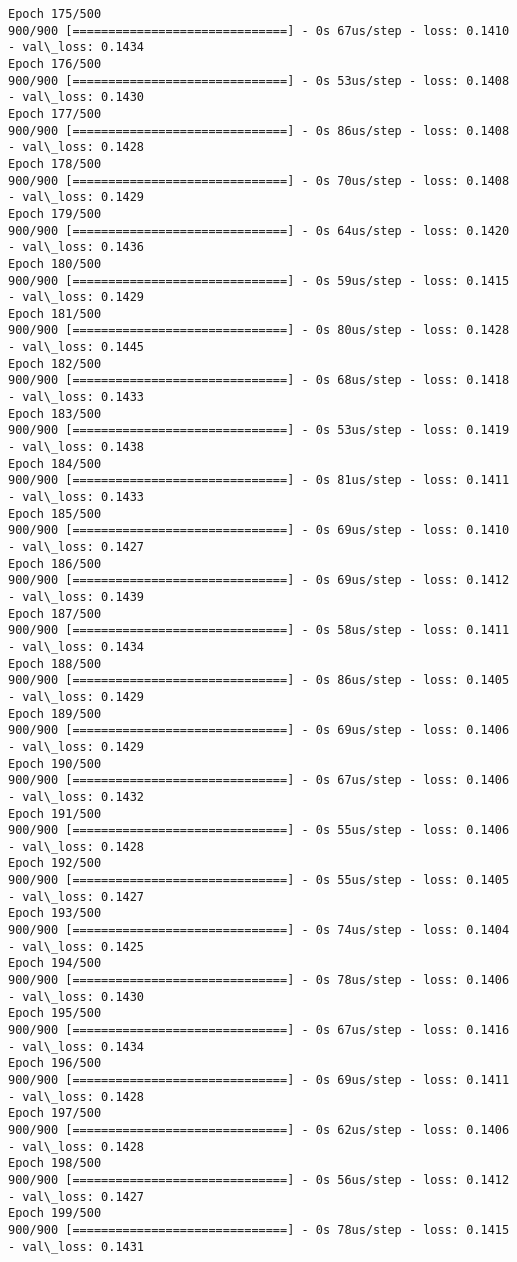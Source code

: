 \documentclass[11pt]{article}
\begin{document}
\begin{Verbatim}[commandchars=\\\{\}]
Epoch 175/500
900/900 [==============================] - 0s 67us/step - loss: 0.1410 - val\_loss: 0.1434
Epoch 176/500
900/900 [==============================] - 0s 53us/step - loss: 0.1408 - val\_loss: 0.1430
Epoch 177/500
900/900 [==============================] - 0s 86us/step - loss: 0.1408 - val\_loss: 0.1428
Epoch 178/500
900/900 [==============================] - 0s 70us/step - loss: 0.1408 - val\_loss: 0.1429
Epoch 179/500
900/900 [==============================] - 0s 64us/step - loss: 0.1420 - val\_loss: 0.1436
Epoch 180/500
900/900 [==============================] - 0s 59us/step - loss: 0.1415 - val\_loss: 0.1429
Epoch 181/500
900/900 [==============================] - 0s 80us/step - loss: 0.1428 - val\_loss: 0.1445
Epoch 182/500
900/900 [==============================] - 0s 68us/step - loss: 0.1418 - val\_loss: 0.1433
Epoch 183/500
900/900 [==============================] - 0s 53us/step - loss: 0.1419 - val\_loss: 0.1438
Epoch 184/500
900/900 [==============================] - 0s 81us/step - loss: 0.1411 - val\_loss: 0.1433
Epoch 185/500
900/900 [==============================] - 0s 69us/step - loss: 0.1410 - val\_loss: 0.1427
Epoch 186/500
900/900 [==============================] - 0s 69us/step - loss: 0.1412 - val\_loss: 0.1439
Epoch 187/500
900/900 [==============================] - 0s 58us/step - loss: 0.1411 - val\_loss: 0.1434
Epoch 188/500
900/900 [==============================] - 0s 86us/step - loss: 0.1405 - val\_loss: 0.1429
Epoch 189/500
900/900 [==============================] - 0s 69us/step - loss: 0.1406 - val\_loss: 0.1429
Epoch 190/500
900/900 [==============================] - 0s 67us/step - loss: 0.1406 - val\_loss: 0.1432
Epoch 191/500
900/900 [==============================] - 0s 55us/step - loss: 0.1406 - val\_loss: 0.1428
Epoch 192/500
900/900 [==============================] - 0s 55us/step - loss: 0.1405 - val\_loss: 0.1427
Epoch 193/500
900/900 [==============================] - 0s 74us/step - loss: 0.1404 - val\_loss: 0.1425
Epoch 194/500
900/900 [==============================] - 0s 78us/step - loss: 0.1406 - val\_loss: 0.1430
Epoch 195/500
900/900 [==============================] - 0s 67us/step - loss: 0.1416 - val\_loss: 0.1434
Epoch 196/500
900/900 [==============================] - 0s 69us/step - loss: 0.1411 - val\_loss: 0.1428
Epoch 197/500
900/900 [==============================] - 0s 62us/step - loss: 0.1406 - val\_loss: 0.1428
Epoch 198/500
900/900 [==============================] - 0s 56us/step - loss: 0.1412 - val\_loss: 0.1427
Epoch 199/500
900/900 [==============================] - 0s 78us/step - loss: 0.1415 - val\_loss: 0.1431

\end{Verbatim}
\end{document}
